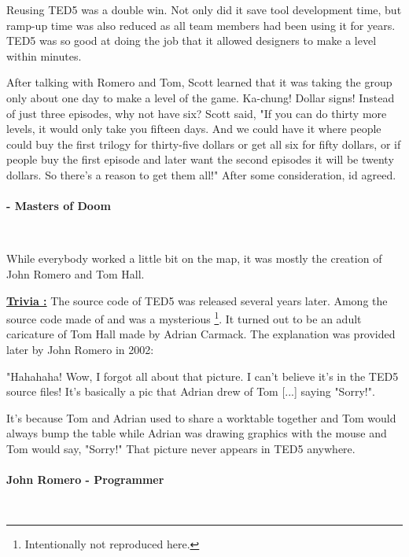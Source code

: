 \documentclass[book.tex]{subfiles}
\begin{document}
Reusing TED5 was a double win. Not only did it save tool development time, but ramp-up time was also reduced as all team members had been using it for years. TED5 was so good at doing the job that it allowed designers to make a level within minutes.\\
\par

 \begin{fancyquotes}
After talking with Romero and Tom, Scott learned that it was taking the group only about one day to make a level of the game. Ka-chung! Dollar signs! Instead of just three episodes, why not have six? Scott said, "If you can do thirty more levels, it would only take you fifteen days. And we could have it where people could buy the first trilogy for thirty-five dollars or get all six for fifty dollars, or if people buy the first episode and later want the second episodes it will be twenty dollars. So there's a reason to get them all!" After some consideration, id agreed.\\
\\
 \textbf{- Masters of Doom}
 \end{fancyquotes}\\

\par
While everybody worked a little bit on the map, it was mostly the creation of John Romero and Tom Hall.\\
\par
 \textbf{\underline{Trivia :}} The source code of TED5 was released several years later. Among the source code made of  and  was a mysterious \footnote{Intentionally not reproduced here.}. It turned out to be an adult caricature of Tom Hall made by Adrian Carmack. The explanation was provided later by John Romero in 2002:\\
\par
 \begin{fancyquotes}
   "Hahahaha! Wow, I forgot all about that picture. I can't believe it's 
in the TED5 source files! It's basically a pic that Adrian drew of Tom 
[...] saying "Sorry!".\\
\par 
It's because Tom and Adrian used to share a worktable together and Tom 
would always bump the table while Adrian was drawing graphics with the 
mouse and Tom would say, "Sorry!" That picture never appears in TED5 
anywhere.\\
   \\
\textbf{John Romero - Programmer}
 \end{fancyquotes}\\
\end{document}
